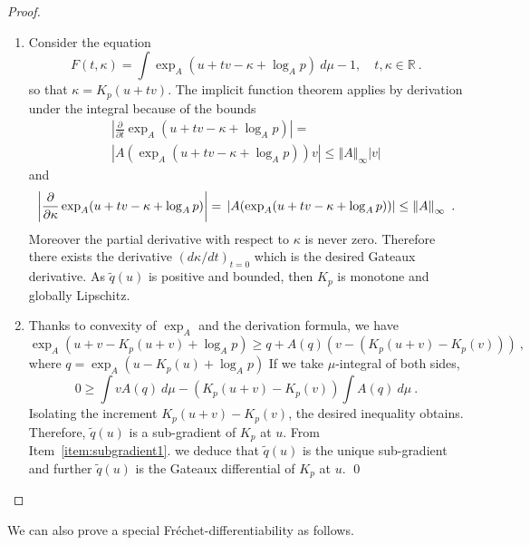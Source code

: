 \documentclass[graybox]{svmult}
\begin{document}
\begin{proof}
\begin{enumerate}
\item Consider the equation 
\begin{equation*}
F(t,\kappa )=\int \exp _{A}(u+tv-\kappa +\log _{A}p)\ d\mu -1,\quad t,\kappa
\in \mathbb{R} \ .
\end{equation*}
so that $\kappa = K_p(u+tv)$. The implicit function theorem applies by derivation under the integral because of the bounds 
\begin{multline*}
\left\vert \frac{\partial }{\partial t}\exp _{A}(u+tv-\kappa +\log
_{A}p)\right\vert = \\
\left\vert A(\exp _{A}(u+tv-\kappa +\log _{A}p))v\right\vert \leq \left\Vert
A\right\Vert _{\infty }\left\vert v\right\vert
\end{multline*}
and 
\begin{equation*}
\left\vert \frac{\partial }{\partial \kappa }\exp _{A}(u+tv-\kappa +\log
_{A}p)\right\vert = \\
\left\vert A(\exp _{A}(u+tv-\kappa +\log _{A}p))\right\vert \leq \left\Vert
A\right\Vert _{\infty }\ .
\end{equation*}
Moreover the partial derivative with respect to $\kappa$ is never zero.
Therefore there exists the derivative $\left( d\kappa /dt\right) _{t=0}$
which is the desired Gateaux derivative. As $\widetilde q(u)$ is positive and bounded, then $K_p$ is monotone and globally Lipschitz.
%
\item Thanks to convexity of $\exp _{A}$ and the derivation formula, we
have 
\begin{equation*}
\exp _{A}(u+v-K_{p}(u+v)+\log _{A}p)\geq q+A(q)(v-(K_{p}(u+v)-K_{p}(v)))\ ,
\end{equation*}
where $q = \exp_A(u - K_p(u) + \log_A p)$
If we take $\mu $-integral of both sides, 
\begin{equation*}
0\geq \int vA(q)\ d\mu -(K_{p}(u+v)-K_{p}(v))\int A(q)\ d\mu \ .
\end{equation*}
Isolating the increment $K_{p}(u+v)-K_{p}(v)$, the desired inequality
obtains. Therefore, $\widetilde{q}(u)$ is a sub-gradient of $K_{p}$ at $u$.
From Item~\ref{item:subgradient1}. we deduce that $\widetilde{q}(u)$ is the unique sub-gradient and further $\widetilde{q}(u)$ is the Gateaux differential of $K_{p}$ at $u$. \qed
\end{enumerate}
\end{proof}

We can also prove a special Fr\'echet-differentiability as follows.
\end{document}
